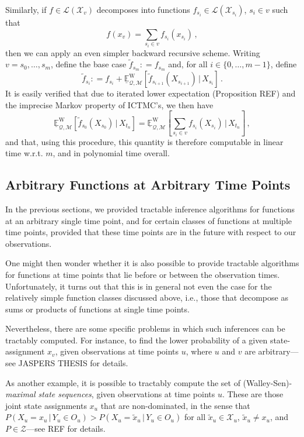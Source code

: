 \documentclass[twoside,11pt]{article}
\newcommand{\states}{\mathcal{X}}
\newcommand{\lexp}{\underline{\mathbb{E}}_{\rateset,\mathcal{M}}^\mathrm{W}}
\newcommand{\gambles}{\mathcal{L}}
\newcommand{\rateset}{\mathcal{Q}}
\newcommand{\coloneqq}{:\!=}
\newcommand{\ictmc}{{ICTMC}}
\begin{document}
Similarly, if $f\in\gambles(\states_v)$ decomposes into functions $f_{s_i}\in\gambles(\states_{s_i})$, $s_i\in v$ such that
\begin{equation*}
f(x_v) = \sum_{s_i\in v} f_{s_i}(x_{s_i})\,,
\end{equation*}
then we can apply an even simpler backward recursive scheme. Writing $v=s_0,\ldots,s_m$, define the base case $\tilde{f}_{s_m}\coloneqq f_{s_m}$ and, for all $i\in\{0,\ldots,m-1\}$, define
\begin{equation*}
\tilde{f}_{s_i} \coloneqq f_{s_i} + \lexp[\tilde{f}_{s_{i+1}}(X_{s_{i+1}})\,\vert\,X_{s_i}]\,.
\end{equation*}
It is easily verified that due to iterated lower expectation (Proposition REF) and the imprecise Markov property of \ictmc's, we then have
\begin{equation*}
\lexp[\tilde{f}_{s_0}(X_{s_0})\,\vert\,X_{t_n}] = \lexp\left[\sum_{s_i\in v} f_{s_i}(X_{s_i})\,\vert\,X_{t_n}\right]\,,
\end{equation*}
and that, using this procedure, this quantity is therefore computable in linear time w.r.t. $m$, and in polynomial time overall.

\subsection{Arbitrary Functions at Arbitrary Time Points}

In the previous sections, we provided tractable inference algorithms for functions at an arbitrary single time point, and for certain classes of functions at multiple time points, provided that these time points are in the future with respect to our observations.

One might then wonder whether it is also possible to provide tractable algorithms for functions at time points that lie before or between the observation times. Unfortunately, it turns out that this is in general not even the case for the relatively simple function classes discussed above, i.e., those that decompose as sums or products of functions at single time points.

Nevertheless, there are some specific problems in which such inferences can be tractably computed. For instance, to find the lower probability of a given state-assignment $x_v$, given observations at time points $u$, where $u$ and $v$ are arbitrary---see JASPERS THESIS for details. 

As another example, it is possible to tractably compute the set of (Walley-Sen)-\emph{maximal state sequences}, given observations at time points $u$. These are those joint state assignments $x_u$ that are non-dominated, in the sense that $P(X_u=x_u\,\vert\,Y_u\in O_u)> P(X_u=\tilde{x}_u\,\vert\,Y_u\in O_u)$ for all $\tilde{x}_u\in\states_u$, $\tilde{x}_u\neq x_u$, and $P\in\mathcal{Z}$---see REF for details.
\end{document}
